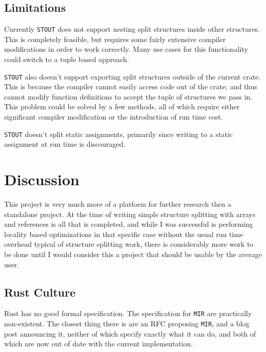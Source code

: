 \documentclass[12pt,oneside]{book}
\newcommand{\mirname}{{\texttt{MIR}}}
\def \mir {\mirname{}\xspace}
\newcommand{\llvmname}{{\texttt{LLVM}}}
\def \llvm {\llvmname{}\xspace}
\newcommand{\projectname}{{\texttt{STOUT}}}
\def \name{\projectname\xspace}
\begin{document}
\section{Limitations}
\label{sec:limits}
Currently \name does not support nesting split structures inside other structures.
This is completely feasible, but requires some fairly extensive compiler
modifications in order to work correctly. Many use cases for this functionality
could switch to a tuple based approach.

\name also doesn't support exporting split structures outside of the current crate.
This is because the compiler cannot easily access code out of the crate, and
thus cannot modify function definitions to accept the tuple of structures we
pass in. This problem could be solved by a few methods, all of which require
either significant compiler modification or the introduction of run
time cost. 

\name doesn't split static assignments, primarily since writing to a static
assignment at run time is discouraged.

\chapter{Discussion}
\label{sec:discuss}

This project is very much more of a platform for further research then a
standalone project. At the time of writing simple structure splitting
with arrays and references is all that is completed, and 
while I was successful is performing locality based
optimizations in that specific case without the usual run time overhead typical of structure splitting
work, there is considerably more work to be done until I would consider this
a project that should be usable by the average user.

\todo[inline]{Maybe talk about why not \llvm or \texttt{ghc}}

\section{Rust Culture}
\label{sec:culture}

Rust has no good
formal specification. The specification for \mir are practically non-existent. %
The closest thing there is are an RFC proposing \mir, and a blog post announcing
it, neither of which specify exactly what it can do, and both of which are now
out of date with the current implementation.
\end{document}
